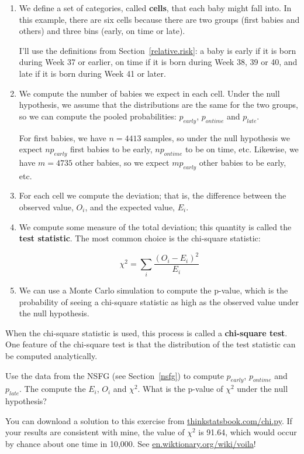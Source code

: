\documentclass[12pt]{book}
\begin{document}
\begin{enumerate}

\item We define a set of categories, called {\bf cells}, that each
  baby might fall into.  In this example, there are six cells because
  there are two groups (first babies and others) and three bins
  (early, on time or late).

I'll use the definitions from Section~\ref{relative.risk}: a baby is
early if it is born during Week 37 or earlier, on time if it is born
during Week 38, 39 or 40, and late if it is born during Week 41 or
later.

\item We compute the number of babies we expect in each cell.  Under
  the null hypothesis, we assume that the distributions are the same
  for the two groups, so we can compute the pooled probabilities:
  $p_{early}$, $p_{ontime}$ and $p_{late}$.

For first babies, we have $n=4413$ samples, so under the null hypothesis
we expect $n p_{early}$ first babies to be early, $n p_{ontime}$ to be
on time, etc.  Likewise, we have $m=4735$ other babies, so we expect
$m p_{early}$ other babies to be early, etc.

\item For each cell we compute the deviation; that is, the difference
  between the observed value, $O_i$, and the expected value, $E_i$.

\item We compute some measure of the total deviation; this quantity
is called the {\bf test statistic}.  The most common
choice is the chi-square statistic:

  \[ \chi^2 = \sum_i \frac{(O_i - E_i)^2}{E_i} \]


\item We can use a Monte Carlo simulation to compute the p-value,
  which is the probability of seeing a chi-square statistic as high
  as the observed value under the null hypothesis.

\end{enumerate}

When the chi-square statistic is used, this process is called a 
{\bf chi-square test}.  One feature of the chi-square test is that
the distribution of the test statistic can be computed analytically.

\begin{ex}

Use the data from the NSFG (see Section~\ref{nsfg}) to compute
$p_{early}$, $p_{ontime}$ and $p_{late}$.  The compute the $E_i$,
$O_i$ and $\chi^2$.  What is the p-value of $\chi^2$ under the null
hypothesis?

You can download a solution to this exercise from
\url{thinkstatsbook.com/chi.py}.  If your results are consistent with
mine, the value of $\chi^2$ is 91.64, which would occur by chance
about one time in 10,000.  See \url{en.wiktionary.org/wiki/voila}!

\end{ex}
\end{document}
